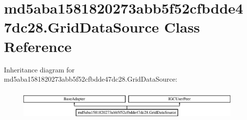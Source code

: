 \hypertarget{classmd5aba1581820273abb5f52cfbdde47dc28_1_1GridDataSource}{}\section{md5aba1581820273abb5f52cfbdde47dc28.\+Grid\+Data\+Source Class Reference}
\label{classmd5aba1581820273abb5f52cfbdde47dc28_1_1GridDataSource}
Inheritance diagram for md5aba1581820273abb5f52cfbdde47dc28.\+Grid\+Data\+Source\+:\begin{figure}[H]
\begin{center}
\leavevmode
\includegraphics[height=1.573034cm]{classmd5aba1581820273abb5f52cfbdde47dc28_1_1GridDataSource}
\end{center}
\end{figure}
